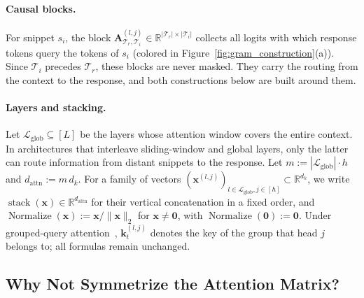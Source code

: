 \documentclass{article}
\begin{document}
\paragraph{Causal blocks.}
For snippet $s_i$, the block $\mathbf{A}^{(l,j)}_{\mathcal{T}_r, \mathcal{T}_i} \in \mathbb{R}^{|\mathcal{T}_r| \times |\mathcal{T}_i|}$ collects all logits with which response tokens query the tokens of $s_i$ (colored in Figure~\ref{fig:gram_construction}(a)). Since $\mathcal{T}_i$ precedes $\mathcal{T}_r$, these blocks are never masked. They carry the routing from the context to the response, and both constructions below are built around them.

\paragraph{Layers and stacking.}
Let $\mathcal{L}_{\text{glob}} \subseteq [L]$ be the layers whose attention window covers the entire context. In architectures that interleave sliding-window and global layers, only the latter can route information from distant snippets to the response. Let $m := |\mathcal{L}_{\text{glob}}| \cdot h$ and $d_{\text{attn}} := m\, d_k$. For a family of vectors $(\mathbf{x}^{(l,j)})_{l \in \mathcal{L}_{\text{glob}}, j \in [h]} \subset \mathbb{R}^{d_k}$, we write $\operatorname{stack}(\mathbf{x}) \in \mathbb{R}^{d_{\text{attn}}}$ for their vertical concatenation in a fixed order, and $\operatorname{Normalize}(\mathbf{x}) := \mathbf{x}/\|\mathbf{x}\|_2$ for $\mathbf{x} \neq \mathbf{0}$, with $\operatorname{Normalize}(\mathbf{0}) := \mathbf{0}$. Under grouped-query attention~\cite{ainslie2023gqa}, $\mathbf{k}_t^{(l,j)}$ denotes the key of the group that head $j$ belongs to; all formulas remain unchanged.

\subsection{Why Not Symmetrize the Attention Matrix?}
\label{subsec:no_symmetrization}
\end{document}
